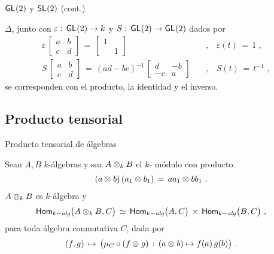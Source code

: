 \begin{frame}{$\GL(2)$ y $\SL(2)$ (cont.)}
	\begin{propoLinealGeneral}\label{propo:linealgeneral}
		$\Delta$, junto con $\varepsilon:\,\GL(2)\rightarrow k$ y
		$S:\,\GL(2)\rightarrow\GL(2)$ dados por
		\begin{align*}
			\varepsilon\,
				\begin{bmatrix} a & b \\ c & d \end{bmatrix}
				\,=\,\begin{bmatrix} 1 & \\ & 1 \end{bmatrix}
				& \quad\text{,}\quad
				\varepsilon(t)\,=\,1 \text{ ,} \\
			S\,\begin{bmatrix} a & b \\ c & d \end{bmatrix}
				\,=\,(ad-bc)^{-1}\,
				\begin{bmatrix} d & -b \\ -c & a \end{bmatrix}
				& \quad\text{,}\quad
				S(t) \,=\,t^{-1}
			\text{ ,}
		\end{align*}
		se corresponden con el producto, la identidad y el inverso.
	\end{propoLinealGeneral}
\end{frame}

\subsection{Producto tensorial}

\begin{frame}{Producto tensorial de \'{a}lgebras}
	\begin{propoProductoTensorial}\label{propo:productotensorial}
		Sean $A,B$ $k$-\'{a}lgebras y sea $A\tensor[k]B$ el $k$-%
		m\'{o}dulo con producto
		\begin{align*}
			(a\tensor b)\,(a_1\tensor b_1) & \,=\,
				aa_1\tensor bb_1
			\text{ .}
		\end{align*}
		$A\tensor[k]B$ es $k$-\'{a}lgebra y
		\begin{align*}
			\Homalg\big(A\tensor[k]B,C\big) & \,\simeq\,
				\Homalg\big(A,C\big)\,\times\,
				\Homalg\big(B,C\big)
			\text{ ,}
		\end{align*}
		para toda \'{a}lgebra conmutativa $C$, dada por
		\begin{align*}
			& (f,g) \,\mapsto\, \big(\mu_C\circ(f\tensor g)\,:\,
				(a\tensor b)\mapsto f(a)\,g(b)\big)
			\text{ .}
		\end{align*}
	\end{propoProductoTensorial}
\end{frame}

